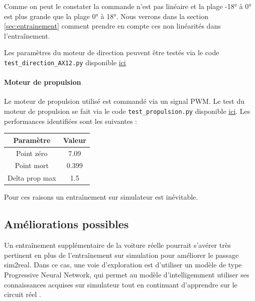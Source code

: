 \documentclass[french]{article}
\begin{document}
Comme on peut le constater la commande n'est pas linéaire et la plage -18° à 0° est plus grande que la plage 0° à 18°. Nous verrons dans la section \ref{sec:entrainement} comment prendre en compte ces non linéarités dans l'entraînement.

\vspace{0.5cm}

Les paramètres du moteur de direction peuvent être testés via le code \verb|test_direction_AX12.py| disponible \href{https://github.com/basileplus/RCAutonomousCar.git}{ici}
    

\paragraph{Moteur de propulsion}

Le moteur de propulsion utilisé est commandé via un signal PWM. 
Le test du moteur de propulsion se fait via le code \verb|test_propulsion.py| disponible \href{https://github.com/basileplus/RCAutonomousCar.git}{ici}. Les performances identifiées sont les suivantes :

\begin{table}[H]
    \centering
    \begin{tabular}{|c|c|}
        \hline
        Paramètre        & Valeur \\
        \hline
        Point zéro       & 7.09  \\
        \hline
        Point mort       & 0.399 \\
        \hline
        Delta prop max   & 1.5   \\
        \hline
    \end{tabular}
\end{table}

\vspace*{0.5cm}

Pour ces raisons un entraînement sur simulateur est inévitable. 

\subsection{Améliorations possibles}

Un entraînement supplémentaire de la voiture réelle pourrait s'avérer très pertinent en plus de l'entraînement sur simulation pour améliorer le passage sim2real. Dans ce cas, une voie d'exploration est d'utiliser un modèle de type Progressive Neural Network, qui permet au modèle d'intelligemment utiliser ses connaissances acquises sur simulateur tout en continuant d'apprendre sur le circuit réel \cite{rusu2022progressive}. 
\end{document}
